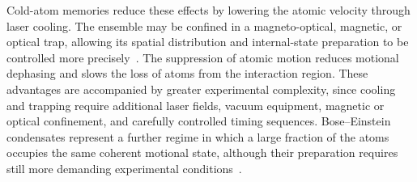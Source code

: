 Cold-atom memories reduce these effects by lowering the atomic velocity through laser cooling. The ensemble may be confined in a magneto-optical, magnetic, or optical trap, allowing its spatial distribution and internal-state preparation to be controlled more precisely~\cite{Qmeaara_HeshamiEtAl_2016,JiangEtAl_2016}. The suppression of atomic motion reduces motional dephasing and slows the loss of atoms from the interaction region. These advantages are accompanied by greater experimental complexity, since cooling and trapping require additional laser fields, vacuum equipment, magnetic or optical confinement, and carefully controlled timing sequences. Bose--Einstein condensates represent a further regime in which a large fraction of the atoms occupies the same coherent motional state, although their preparation requires still more demanding experimental conditions~\cite{Qmeaara_HeshamiEtAl_2016}.


